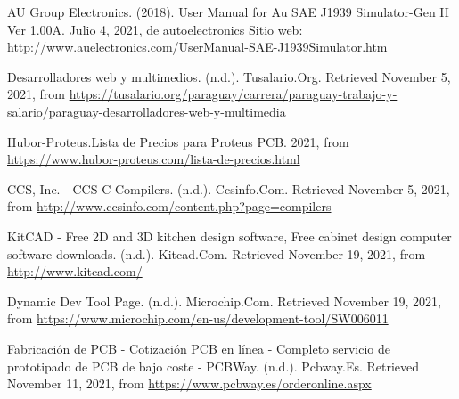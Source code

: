 \begin{thebibliography}{99}







 AU Group Electronics. (2018). User Manual for Au SAE J1939 Simulator-Gen II Ver 1.00A. Julio 4, 2021, de autoelectronics Sitio web: \url{ http://www.auelectronics.com/UserManual-SAE-J1939Simulator.htm}
 

 Desarrolladores web y multimedios. (n.d.). Tusalario.Org. Retrieved November 5, 2021, from \url{https://tusalario.org/paraguay/carrera/paraguay-trabajo-y-salario/paraguay-desarrolladores-web-y-multimedia}

 Hubor-Proteus.Lista de Precios para Proteus PCB. 2021, from \url{https://www.hubor-proteus.com/lista-de-precios.html}

CCS, Inc. - CCS C Compilers. (n.d.). Ccsinfo.Com. Retrieved November 5, 2021, from \url{http://www.ccsinfo.com/content.php?page=compilers}



 KitCAD - Free 2D and 3D kitchen design software, Free cabinet design computer software downloads. (n.d.). Kitcad.Com. Retrieved November 19, 2021, from \url{http://www.kitcad.com/}

 Dynamic Dev Tool Page. (n.d.). Microchip.Com. Retrieved November 19, 2021, from \url{https://www.microchip.com/en-us/development-tool/SW006011}

 Fabricación de PCB - Cotización PCB en línea - Completo servicio de prototipado de PCB de bajo coste - PCBWay. (n.d.). Pcbway.Es. Retrieved November 11, 2021, from \url{https://www.pcbway.es/orderonline.aspx}


\end{thebibliography}